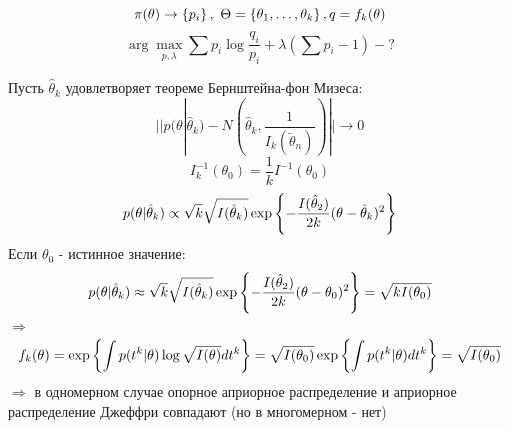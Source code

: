 \begin{example}
$$ \pi(\theta) \to \left\{ p_i \right\}, \ \Theta = \left\{ \theta_1, \ldots, \theta_k \right\}, q=f_k(\theta) $$
$$ \arg \max_{\substack{p, \lambda}} \sum p_i \log \frac{q_i}{p_i} + \lambda(\sum p_i-1) - ? $$
\end{example}

\begin{example}
Пусть $\hat{\theta}_k$ удовлетворяет теореме Бернштейна-фон Мизеса:
$$ || p(\theta|\hat{\theta}_k) - N(\hat{\theta}_k, \frac{1}{I_k(\breve{\theta}_n)}) || \to 0 $$
$$ I^{-1}_k(\theta_0) = \frac{1}{k}I^{-1}(\theta_0) $$
$$ p(\theta|\hat{\theta}_k) \propto \sqrt{k} \sqrt{I(\hat{\theta}_k)} \exp \left\{ -\frac{I(\hat{\theta}_2)}{2k}(\theta - \hat{\theta}_k)^2 \right\} $$
Если $\theta_0$ - истинное значение:
$$  p(\theta|\hat{\theta}_k) \approx \sqrt{k} \sqrt{I(\hat{\theta}_k)} \exp \left\{ -\frac{I(\hat{\theta}_2)}{2k}(\theta - \theta_0)^2 \right\} = \sqrt{kI(\theta_0)}$$
$\Rightarrow$
$$ f_k(\theta) = \exp \left\{ \int p(t^k|\theta) \log \sqrt{I(\theta)} dt^k \right\} = \sqrt{I(\theta_0)} \exp \left\{ \int p(t^k|\theta) dt^k \right\} = \sqrt{I(\theta_0)} $$
$\Rightarrow$ в одномерном случае опорное априорное распределение и априорное распределение Джеффри совпадают (но в многомерном - нет)
	
\end{example}